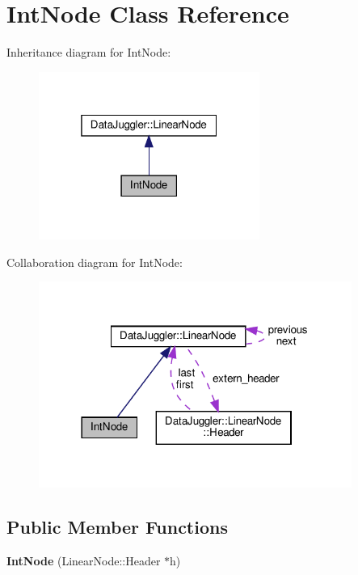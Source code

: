\hypertarget{classIntNode}{}\section{Int\+Node Class Reference}
\label{classIntNode}


Inheritance diagram for Int\+Node\+:
\nopagebreak
\begin{figure}[H]
\begin{center}
\leavevmode
\includegraphics[width=205pt]{classIntNode__inherit__graph}
\end{center}
\end{figure}


Collaboration diagram for Int\+Node\+:
\nopagebreak
\begin{figure}[H]
\begin{center}
\leavevmode
\includegraphics[width=290pt]{classIntNode__coll__graph}
\end{center}
\end{figure}
\subsection*{Public Member Functions}
\begin{DoxyCompactItemize}
\item 
\mbox{\label{classIntNode_ac490b2a921b3de05deafd8c37f8f259b}} 
{\bfseries Int\+Node} (Linear\+Node\+::\+Header $\ast$h)
\end{DoxyCompactItemize}
